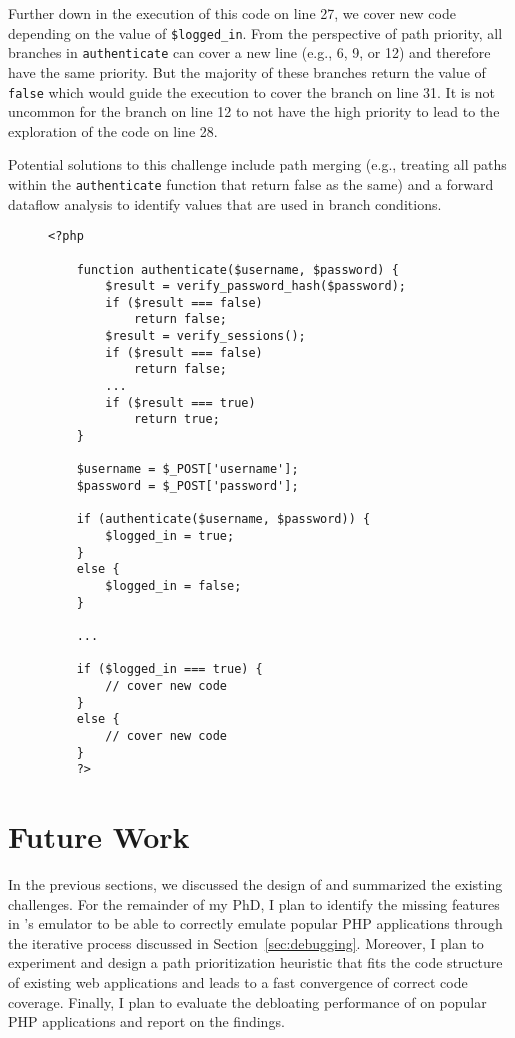 Further down in the execution of this code on line 27, we cover new code depending on the value of \texttt{\$logged\_in}. 
From the perspective of path priority, all branches in \texttt{authenticate} can cover a new line (e.g., 6, 9, or 12) and therefore have the same priority. 
But the majority of these branches return the value of \texttt{false} which would guide the execution to cover the branch on line 31. 
It is not uncommon for the branch on line 12 to not have the high priority to lead to the exploration of the code on line 28. 

Potential solutions to this challenge include path merging (e.g., treating all paths within the \texttt{authenticate} function that return false as the same) and a forward dataflow analysis to identify values that are used in branch conditions. 



\begin{figure}[t]
    \begin{lstlisting}[frame=single, caption={Demonstrating symbolic branches that affect the code coverage in later parts of the code},captionpos=b, label={listing:path_explosion}]
    <?php

    function authenticate($username, $password) {
        $result = verify_password_hash($password);
        if ($result === false) 
            return false;
        $result = verify_sessions();
        if ($result === false) 
            return false;
        ...
        if ($result === true)
            return true;
    }

    $username = $_POST['username'];
    $password = $_POST['password'];

    if (authenticate($username, $password)) {
        $logged_in = true;
    }
    else {
        $logged_in = false;
    }

    ...

    if ($logged_in === true) {
        // cover new code
    }
    else {
        // cover new code
    }
    ?>
    \end{lstlisting}
\end{figure}

\section{Future Work}

In the previous sections, we discussed the design of \animatedead{} and summarized the existing challenges. 
For the remainder of my PhD, I plan to identify the missing features in \animatedead{}'s emulator to be able to correctly emulate popular PHP applications through the iterative process discussed in Section~\ref{sec:debugging}. 
Moreover, I plan to experiment and design a path prioritization heuristic that fits the code structure of existing web applications and leads to a fast convergence of correct code coverage. 
Finally, I plan to evaluate the debloating performance of \animatedead{} on popular PHP applications and report on the findings. 